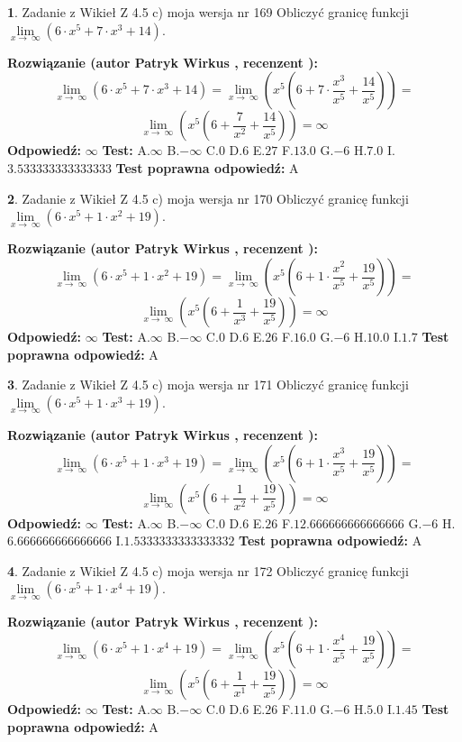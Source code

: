 \documentclass[12pt, a4paper]{article}
\theoremstyle{definition} %
\newtheorem{zad}{}
\newcommand{\zadStart}[1]{\begin{zad}#1\newline}
\newcommand{\zadStop}{\end{zad}}
\newcommand{\rozwStart}[2]{\noindent \textbf{Rozwiązanie (autor #1 , recenzent #2): }\newline}
\newcommand{\rozwStop}{\newline}
\newcommand{\odpStart}{\noindent \textbf{Odpowiedź:}\newline}
\newcommand{\odpStop}{\newline}
\newcommand{\testStart}{\noindent \textbf{Test:}\newline}
\newcommand{\testStop}{\newline}
\newcommand{\kluczStart}{\noindent \textbf{Test poprawna odpowiedź:}\newline}
\newcommand{\kluczStop}{\newline}
\begin{document}
\zadStart{Zadanie z Wikieł Z 4.5 c) moja wersja nr 169}
Obliczyć granicę funkcji  $\lim\limits_{x\to\ \infty}(6 \cdot x^{5}+7 \cdot x^{3}+14)$.
\zadStop
\rozwStart{Patryk Wirkus}{}
$$\lim\limits_{x\to\ \infty}(6 \cdot x^{5}+7 \cdot x^{3}+14) = \lim\limits_{x\to\ \infty}(x^{5}(6 +7 \cdot \frac{x^{3}}{x^{5}}+\frac{14}{x^{5}})) =$$ $$\lim\limits_{x\to\ \infty}(x^{5}(6 +\frac{7}{x^{2}}+\frac{14}{x^{5}})) =\infty$$
\rozwStop
\odpStart
$\infty$
\odpStop
\testStart
A.$\infty$ B.$-\infty$ C.$0$ D.$6$ E.$27$
F.$13.0$ G.$-6$
H.$7.0$
I.$3.533333333333333$
\testStop
\kluczStart
A
\kluczStop



\zadStart{Zadanie z Wikieł Z 4.5 c) moja wersja nr 170}
Obliczyć granicę funkcji  $\lim\limits_{x\to\ \infty}(6 \cdot x^{5}+1 \cdot x^{2}+19)$.
\zadStop
\rozwStart{Patryk Wirkus}{}
$$\lim\limits_{x\to\ \infty}(6 \cdot x^{5}+1 \cdot x^{2}+19) = \lim\limits_{x\to\ \infty}(x^{5}(6 +1 \cdot \frac{x^{2}}{x^{5}}+\frac{19}{x^{5}})) =$$ $$\lim\limits_{x\to\ \infty}(x^{5}(6 +\frac{1}{x^{3}}+\frac{19}{x^{5}})) =\infty$$
\rozwStop
\odpStart
$\infty$
\odpStop
\testStart
A.$\infty$ B.$-\infty$ C.$0$ D.$6$ E.$26$
F.$16.0$ G.$-6$
H.$10.0$
I.$1.7$
\testStop
\kluczStart
A
\kluczStop



\zadStart{Zadanie z Wikieł Z 4.5 c) moja wersja nr 171}
Obliczyć granicę funkcji  $\lim\limits_{x\to\ \infty}(6 \cdot x^{5}+1 \cdot x^{3}+19)$.
\zadStop
\rozwStart{Patryk Wirkus}{}
$$\lim\limits_{x\to\ \infty}(6 \cdot x^{5}+1 \cdot x^{3}+19) = \lim\limits_{x\to\ \infty}(x^{5}(6 +1 \cdot \frac{x^{3}}{x^{5}}+\frac{19}{x^{5}})) =$$ $$\lim\limits_{x\to\ \infty}(x^{5}(6 +\frac{1}{x^{2}}+\frac{19}{x^{5}})) =\infty$$
\rozwStop
\odpStart
$\infty$
\odpStop
\testStart
A.$\infty$ B.$-\infty$ C.$0$ D.$6$ E.$26$
F.$12.666666666666666$ G.$-6$
H.$6.666666666666666$
I.$1.5333333333333332$
\testStop
\kluczStart
A
\kluczStop



\zadStart{Zadanie z Wikieł Z 4.5 c) moja wersja nr 172}
Obliczyć granicę funkcji  $\lim\limits_{x\to\ \infty}(6 \cdot x^{5}+1 \cdot x^{4}+19)$.
\zadStop
\rozwStart{Patryk Wirkus}{}
$$\lim\limits_{x\to\ \infty}(6 \cdot x^{5}+1 \cdot x^{4}+19) = \lim\limits_{x\to\ \infty}(x^{5}(6 +1 \cdot \frac{x^{4}}{x^{5}}+\frac{19}{x^{5}})) =$$ $$\lim\limits_{x\to\ \infty}(x^{5}(6 +\frac{1}{x^{1}}+\frac{19}{x^{5}})) =\infty$$
\rozwStop
\odpStart
$\infty$
\odpStop
\testStart
A.$\infty$ B.$-\infty$ C.$0$ D.$6$ E.$26$
F.$11.0$ G.$-6$
H.$5.0$
I.$1.45$
\testStop
\kluczStart
A
\kluczStop
\end{document}
